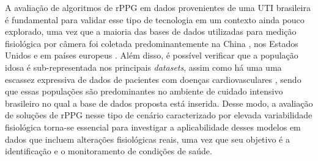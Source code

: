       A avaliação de algoritmos de rPPG em dados provenientes de uma UTI brasileira é fundamental para validar esse tipo de tecnologia em um contexto ainda pouco explorado, uma vez que a maioria das bases de dados utilizadas para medição fisiológica por câmera foi coletada predominantemente na China \cite{liu2023contactless, wang2023contactless, lai2025ubiquitous}, nos Estados Unidos e em países europeus  \cite{cramer2026clinical, van2025camera, rasche2016camera, lee2024review}. Além disso, é possível verificar que a população idosa é sub-representada nos principais \textit{datasets}, assim como há uma uma escassez expressiva de dados de pacientes com doenças cardiovasculares \cite{khan2025representation}, sendo que essas populações são predominantes no ambiente de cuidado intensivo brasileiro \cite{aguiar2021perfil} no qual a base de dados proposta está inserida. Desse modo, a avaliação de soluções de rPPG nesse tipo de cenário caracterizado por elevada variabilidade fisiológica torna-se essencial para investigar a aplicabilidade desses modelos em dados que incluem alterações fisiológicas reais, uma vez que seu objetivo é a identificação e o monitoramento de condições de saúde. 


	